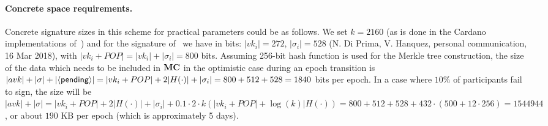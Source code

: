 \paragraph{Concrete space requirements.}
Concrete signature sizes in this scheme for practical parameters
could be as follows.
We set $k = 2160$ (as is done in the Cardano implementations of~\cite{C:KRDO17})
and for the signature of~\cite{PKC:Boldyreva03} we have
 in bits: $|vk_i| = 272$, $|\sigma_i| = 528$
 (N. Di Prima, V. Hanquez, personal communication, 16 Mar 2018), with
 $|vk_i + POP| = |vk_i| + |\sigma_i| = 800$ bits.
 Assuming
256-bit
hash function is used for the Merkle tree construction,
the size of the data which needs to be included
in $\mathbf{MC}$ in the optimistic case during an epoch transition is
$|avk| + |\sigma| + |\langle\mathsf{pending}\rangle| =
|vk_i + POP| + 2|H(\cdot)| + |\sigma_i| = 800 + 512 + 528 = 1840$ bits per epoch. In
a case where $10\%$ of participants fail to sign, the size will be $|avk| +
|\sigma| = |vk_i + POP| + 2|H(\cdot)| + |\sigma_i| + 0.1  \cdot  2  \cdot  k(|vk_i + POP| + \log(k)|H(\cdot))
= 800 + 512 + 528 + 432  \cdot  (500 + 12  \cdot  256) = 1544944$, or about $190$ KB per
epoch (which is approximately 5 days).



